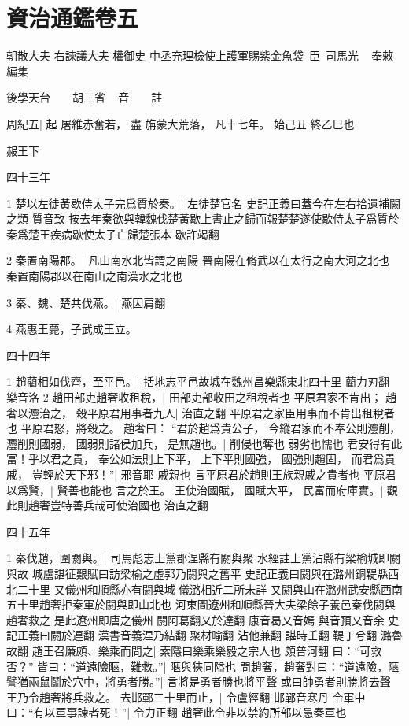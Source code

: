 \chapter{資治通鑑卷五}

\hfill {\large{}朝散大夫 右諫議大夫 權御史 中丞充理檢使上護軍賜紫金魚袋~臣~司馬光 ~ 奉敕編集}

\hfill {\large{}後學天台~　~胡三省 ~ 音　　註}

周紀五|{
	起 屠維赤奮若，
	盡 旃蒙大荒落，
	凡十七年。
	始己丑
	終乙巳也
	}


赧王下


四十三年


1 楚以左徒黃歇侍太子完{\kern 2pt}爲質於秦。|{
	左徒楚官名
	史記正義曰蓋今在左右拾遺補闕之類
	質音致
	按去年秦欲與韓魏伐楚黃歇上書止之歸而報楚楚遂使歇侍太子爲質於秦爲楚王疾病歇使太子亡歸楚張本
	歇許竭翻
	}

2 秦置南陽郡。|{
	凡山南水北皆謂之南陽
	晉南陽在脩武以在太行之南大河之北也
	秦置南陽郡以在南山之南漢水之北也}

3 秦、魏、楚共伐燕。|{
	燕因肩翻}

4 燕惠王薨，子武成王立。


四十四年

1 趙藺相如伐齊，至平邑。|{
	括地志平邑故城在魏州昌樂縣東北四十里
	藺力刃翻
	樂音洛
	}
2 趙田部吏趙奢收租稅，|{
	田部吏部收田之租稅者也}
平原君家不肯出；
趙奢以灋治之，
殺平原君用事者九人|{
	治直之翻
	平原君之家臣用事而不肯出租稅者也}
平原君怒，將殺之。
趙奢曰：
“君於趙爲貴公子，
今縱君家而不奉公則灋削，
灋削則國弱，
國弱則諸侯加兵，
是無趙也。|{
	削侵也奪也
	弱劣也懦也}
君安得有此富！乎以君之貴，
奉公如法則上下平，
上下平則國強，
國強則趙固，
而君爲貴戚，
豈輕於天下邪！”|{
	邪音耶
	戚親也
	言平原君於趙則王族親戚之貴者也}
平原君以爲賢，|{
	賢善也能也}
言之於王。
王使治國賦，
國賦大平，
民富而府庫實。|{
	觀此則趙奢豈特善兵哉可使治國也
	治直之翻
	}


四十五年

1 秦伐趙，圍閼與。|{
	司馬彪志上黨郡涅縣有閼與聚
	水經註上黨沾縣有梁榆城即閼與故
	城盧諶征艱賦曰訪梁榆之虛郭乃閼與之舊平
	史記正義曰閼與在潞州銅鞮縣西北二十里
	又儀州和順縣亦有閼與城
	儀潞相近二所未詳
	又閼與山在潞州武安縣西南五十里趙奢拒秦軍於閼與即山北也
	河東圖遼州和順縣晉大夫梁餘子養邑秦伐閼與趙奢救之
	是此遼州即唐之儀州
	閼阿葛翻又於達翻
	康音曷又音嫣
	與音預又音余
	史記正義曰閼於連翻
	漢書音義涅乃結翻
	聚材喻翻
	沾他兼翻
	諶時壬翻
	鞮丁兮翻
	潞魯故翻
	}
趙王召廉頗、樂乘而問之|{
	索隱曰樂乘樂毅之宗人也
	頗普河翻
	}
曰：“可救否？”
皆曰：“道遠險陿，難救。”|{
	陿與狹同隘也
	}
問趙奢，趙奢對曰：“道遠險，陿譬猶兩鼠鬬於穴中，將勇者勝。”|{
	言將是勇者勝也將平聲
	或曰帥勇者則勝將去聲
	}
王乃令趙奢將兵救之。
去邯鄲三十里而止，|{
	令盧經翻
	邯鄲音寒丹}
令軍中曰：“有以軍事諫者死！”|{
	令力正翻
	趙奢此令非以禁約所部以愚秦軍也}

